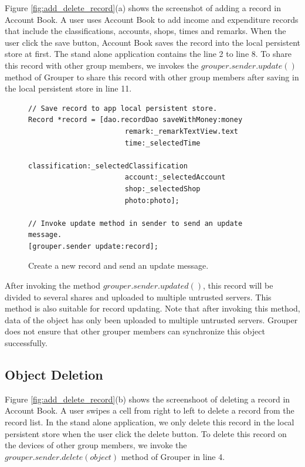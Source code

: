 \documentclass[a4paper,11pt]{report}
\begin{document}
Figure \ref{fig:add_delete_record}(a) shows the screenshot of adding a record in Account Book. 
A user uses Account Book to add income and expenditure records that include the classifications, accounts, shops, times and remarks. 
When the user click the save button, Account Book saves the record into the local persistent store at first.
The stand alone application contains the line 2 to line 8.
To share this record with other group members, we invokes the $grouper.sender.update()$ method of Grouper to share this record with other group members after saving in the local persistent store in line 11.

\begin{figure}
\begin{lstlisting}[frame=none language=Objective-C] 
// Save record to app local persistent store.
Record *record = [dao.recordDao saveWithMoney:money
                       remark:_remarkTextView.text
                       time:_selectedTime
                       classification:_selectedClassification
                       account:_selectedAccount
                       shop:_selectedShop
                       photo:photo];

// Invoke update method in sender to send an update message.
[grouper.sender update:record];
\end{lstlisting}
\caption{Create a new record and send an update message.}
\label{fig:create_record}
\end{figure}

After invoking the method $grouper.sender.updated()$, this record will be divided to several shares and uploaded to multiple untrusted servers.
This method is also suitable for record updating.
Note that after invoking this method, data of the object has only been uploaded to multiple untrusted servers.
Grouper does not ensure that other grouper members can synchronize this object successfully.

\subsection{Object Deletion}

Figure \ref{fig:add_delete_record}(b) shows the screenshoot of deleting a record in Account Book. 
A user swipes a cell from right to left to delete a record from the record list.
In the stand alone application, we only delete this record in the local persistent store when the user click the delete button.
To delete this record on the devices of other group members, we invoke the $grouper.sender.delete(object)$ method of Grouper in line 4.
\end{document}
